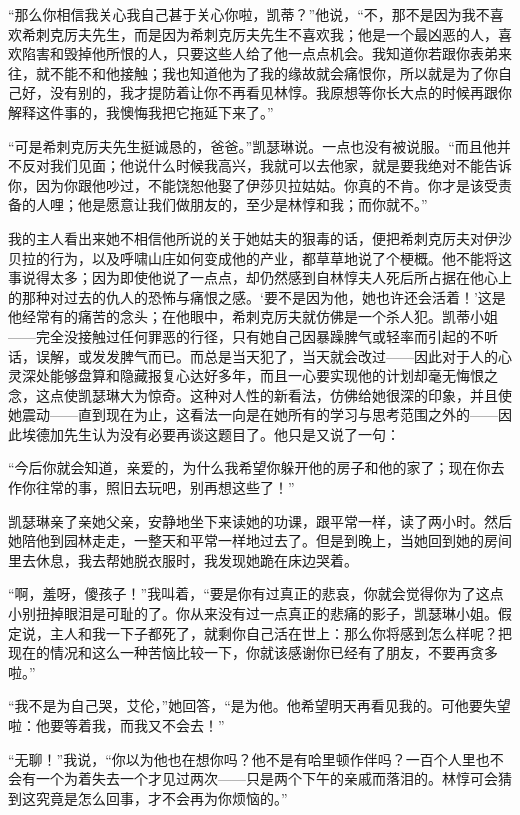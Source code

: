 \par “那么你相信我关心我自己甚于关心你啦，凯蒂？”他说，“不，那不是因为我不喜欢希刺克厉夫先生，而是因为希刺克厉夫先生不喜欢我；他是一个最凶恶的人，喜欢陷害和毁掉他所恨的人，只要这些人给了他一点点机会。我知道你若跟你表弟来往，就不能不和他接触；我也知道他为了我的缘故就会痛恨你，所以就是为了你自己好，没有别的，我才提防着让你不再看见林惇。我原想等你长大点的时候再跟你解释这件事的，我懊悔我把它拖延下来了。”
\par “可是希刺克厉夫先生挺诚恳的，爸爸。”凯瑟琳说。一点也没有被说服。“而且他并不反对我们见面；他说什么时候我高兴，我就可以去他家，就是要我绝对不能告诉你，因为你跟他吵过，不能饶恕他娶了伊莎贝拉姑姑。你真的不肯。你才是该受责备的人哩；他是愿意让我们做朋友的，至少是林惇和我；而你就不。”
\par 我的主人看出来她不相信他所说的关于她姑夫的狠毒的话，便把希刺克厉夫对伊沙贝拉的行为，以及呼啸山庄如何变成他的产业，都草草地说了个梗概。他不能将这事说得太多；因为即使他说了一点点，却仍然感到自林惇夫人死后所占据在他心上的那种对过去的仇人的恐怖与痛恨之感。‘要不是因为他，她也许还会活着！’这是他经常有的痛苦的念头；在他眼中，希刺克厉夫就仿佛是一个杀人犯。凯蒂小姐——完全没接触过任何罪恶的行径，只有她自己因暴躁脾气或轻率而引起的不听话，误解，或发发脾气而已。而总是当天犯了，当天就会改过——因此对于人的心灵深处能够盘算和隐藏报复心达好多年，而且一心要实现他的计划却毫无悔恨之念，这点使凯瑟琳大为惊奇。这种对人性的新看法，仿佛给她很深的印象，并且使她震动——直到现在为止，这看法一向是在她所有的学习与思考范围之外的——因此埃德加先生认为没有必要再谈这题目了。他只是又说了一句：
\par “今后你就会知道，亲爱的，为什么我希望你躲开他的房子和他的家了；现在你去作你往常的事，照旧去玩吧，别再想这些了！”
\par 凯瑟琳亲了亲她父亲，安静地坐下来读她的功课，跟平常一样，读了两小时。然后她陪他到园林走走，一整天和平常一样地过去了。但是到晚上，当她回到她的房间里去休息，我去帮她脱衣服时，我发现她跪在床边哭着。
\par “啊，羞呀，傻孩子！”我叫着，“要是你有过真正的悲哀，你就会觉得你为了这点小别扭掉眼泪是可耻的了。你从来没有过一点真正的悲痛的影子，凯瑟琳小姐。假定说，主人和我一下子都死了，就剩你自己活在世上：那么你将感到怎么样呢？把现在的情况和这么一种苦恼比较一下，你就该感谢你已经有了朋友，不要再贪多啦。”
\par “我不是为自己哭，艾伦，”她回答，“是为他。他希望明天再看见我的。可他要失望啦：他要等着我，而我又不会去！”
\par “无聊！”我说，“你以为他也在想你吗？他不是有哈里顿作伴吗？一百个人里也不会有一个为着失去一个才见过两次——只是两个下午的亲戚而落泪的。林惇可会猜到这究竟是怎么回事，才不会再为你烦恼的。”
